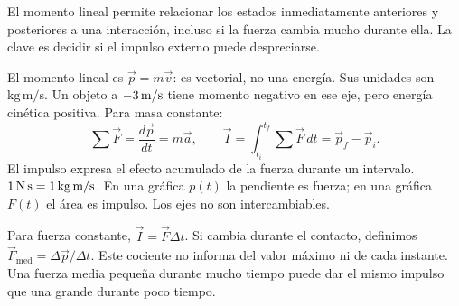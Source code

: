 \documentclass[11pt,a4paper]{article}
\begin{document}
\shorthandoff{<>}
\color{Ink}
El momento lineal permite relacionar los estados inmediatamente anteriores y
posteriores a una interacci\'on, incluso si la fuerza cambia mucho durante ella.
La clave es decidir si el impulso externo puede despreciarse.
\begin{lessonindex}
\end{lessonindex}
\precisionnote

El momento lineal es $\vec p=m\vec v$: es vectorial, no una energ\'ia.
Sus unidades son $\mathrm{kg\,m/s}$.
Un objeto a $-3\,\mathrm{m/s}$ tiene momento negativo en ese eje,
pero energ\'ia cin\'etica positiva. Para masa constante:
\[
\sum\vec F=\frac{d\vec p}{dt}=m\vec a,\qquad
\vec I=\int_{t_i}^{t_f}\sum\vec F\,dt=\vec p_f-\vec p_i.
\]
El impulso expresa el efecto acumulado de la fuerza durante un intervalo.
$1\,\mathrm{N\,s}=1\,\mathrm{kg\,m/s}$.
En una gr\'afica $p(t)$ la pendiente es fuerza; en una gr\'afica $F(t)$ el \'area
es impulso. Los ejes no son intercambiables.

Para fuerza constante, $\vec I=\vec F\Delta t$. Si cambia durante el contacto,
definimos $\vec F_{\mathrm{med}}=\Delta\vec p/\Delta t$.
Este cociente no informa del valor m\'aximo ni de cada instante.
Una fuerza media peque\~na durante mucho tiempo puede dar el mismo impulso que
una grande durante poco tiempo.
\end{document}
